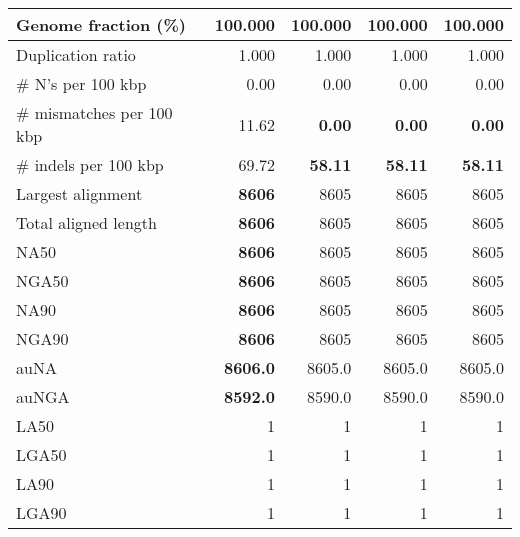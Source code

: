 \documentclass[12pt,a4paper]{article}
\begin{document}
\begin{table}[ht]
\begin{center}
\begin{tabular}{|l*{4}{|r}|}
Genome fraction (\%) & 100.000 & 100.000 & 100.000 & 100.000 \\ \hline
Duplication ratio & 1.000 & 1.000 & 1.000 & 1.000 \\ \hline
\# N's per 100 kbp & 0.00 & 0.00 & 0.00 & 0.00 \\ \hline
\# mismatches per 100 kbp & 11.62 & {\bf 0.00} & {\bf 0.00} & {\bf 0.00} \\ \hline
\# indels per 100 kbp & 69.72 & {\bf 58.11} & {\bf 58.11} & {\bf 58.11} \\ \hline
Largest alignment & {\bf 8606} & 8605 & 8605 & 8605 \\ \hline
Total aligned length & {\bf 8606} & 8605 & 8605 & 8605 \\ \hline
NA50 & {\bf 8606} & 8605 & 8605 & 8605 \\ \hline
NGA50 & {\bf 8606} & 8605 & 8605 & 8605 \\ \hline
NA90 & {\bf 8606} & 8605 & 8605 & 8605 \\ \hline
NGA90 & {\bf 8606} & 8605 & 8605 & 8605 \\ \hline
auNA & {\bf 8606.0} & 8605.0 & 8605.0 & 8605.0 \\ \hline
auNGA & {\bf 8592.0} & 8590.0 & 8590.0 & 8590.0 \\ \hline
LA50 & 1 & 1 & 1 & 1 \\ \hline
LGA50 & 1 & 1 & 1 & 1 \\ \hline
LA90 & 1 & 1 & 1 & 1 \\ \hline
LGA90 & 1 & 1 & 1 & 1 \\ \hline
\end{tabular}
\end{center}
\end{table}
\end{document}
